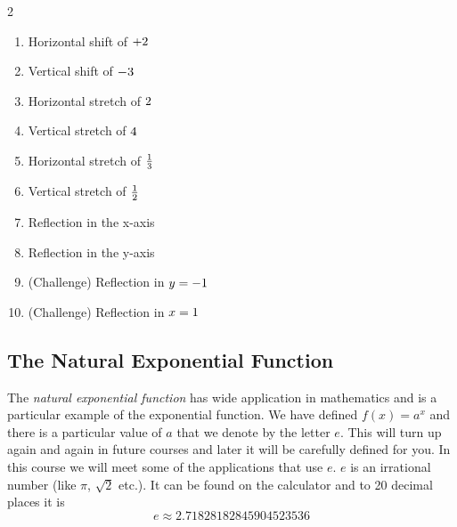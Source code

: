 \columnseprule =0.4pt
\begin {multicols}{2}

\begin{enumerate}
\item Horizontal shift of $ +2\vspace{+2.000000cm}$ 

\item Vertical shift of $ -3\vspace{+2.000000cm}$ 

\item Horizontal stretch of $2\vspace{+2.000000cm}$ 

\item Vertical stretch of $4\vspace{+2.000000cm}$ 

\item Horizontal stretch of $\frac{1}{3}\vspace{+2.000000cm}$ 

\item Vertical stretch of $\frac{1}{2}\vspace{+2.000000cm}$ 

\item Reflection in the x-axis\vspace{2cm}


\item Reflection in the y-axis\vspace{2cm} 

\item (Challenge) Reflection in $y = -1\vspace{+2.000000cm}$ 

\item (Challenge) Reflection in $x =1\vspace{+2.000000cm}$ \end{enumerate}

\end {multicols}

\subsection{The Natural Exponential Function}
The \emph{natural exponential function} has wide application in mathematics and is a particular example of the exponential
function. We have defined $f (x) =a^{x}$ and there is a particular value of $a$ that we denote by the letter $e$. This will turn up again and again in future courses and later it will be carefully
defined for you. In this course we will meet some of the applications that use $e$. $e$ is an irrational number (like $\pi $, $\sqrt{2}$ etc.). It can be found on the calculator and to 20 decimal places it is
\begin{equation*}e \approx 2.71828182845904523536
\end{equation*}

